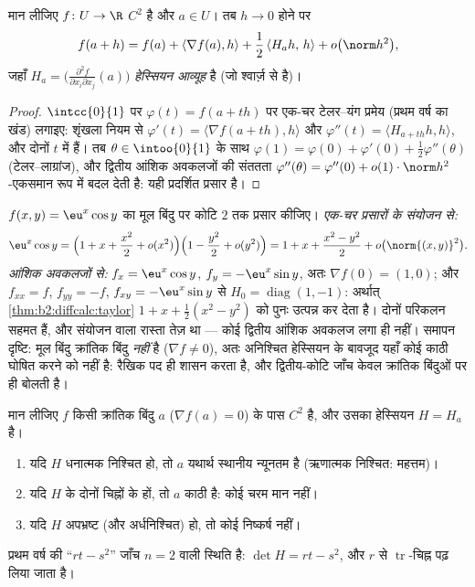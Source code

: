 \begin{theorem}[कोटि 2 पर टेलर--यंग]\label{thm:b2:diffcalc:taylor}
मान लीजिए $f \colon U \to \R$ $C^2$ है और $a \in U$। तब $h \to 0$ होने पर
\[
f(a + h) = f(a) + \langle\nabla f(a), h\rangle
+ \frac12\, \langle H_a h,\, h\rangle + o\bigl(\norm h^2\bigr),
\]
जहाँ $H_a = \bigl(\frac{\partial^2 f}{\partial x_i\partial
x_j}(a)\bigr)$ \emph{हेस्सियन आव्यूह} है (जो श्वार्ज़ से
 है)।
\end{theorem}

\begin{proof}
$\intcc{0}{1}$ पर $\varphi(t) = f(a + th)$ पर एक-चर टेलर--यंग प्रमेय (प्रथम वर्ष का खंड) लगाइए: शृंखला
नियम से $\varphi'(t) = \langle \nabla f(a + th), h\rangle$ और $\varphi''(t)
= \langle H_{a+th}h, h\rangle$, और दोनों $t$ में  हैं। तब $\theta \in \intoo{0}{1}$ के साथ
$\varphi(1) = \varphi(0) + \varphi'(0) + \frac12\varphi''(\theta)$
(टेलर--लाग्रांज), और द्वितीय आंशिक अवकलजों की संततता $\varphi''(\theta) =
\varphi''(0) + o(1)\cdot\norm h^2$-एकसमान रूप में
बदल देती है: यही प्रदर्शित प्रसार है।
\end{proof}

\begin{example}[एक प्रसार, दो तरह से]\label{ex:b2:diffcalc:taylortwoways}
$f(x, y) = \eu^x\cos y$ का मूल बिंदु पर कोटि $2$ तक प्रसार कीजिए। \emph{एक-चर प्रसारों के
संयोजन से:}
\[
\eu^x\cos y = \Bigl(1 + x + \frac{x^2}{2} +
o(x^2)\Bigr)\Bigl(1 - \frac{y^2}{2} + o(y^2)\Bigr)
= 1 + x + \frac{x^2 - y^2}{2} + o\bigl(\norm{(x,y)}^2\bigr) .
\]
\emph{आंशिक अवकलजों से:} $f_x = \eu^x\cos y$, $f_y =
-\eu^x\sin y$, अतः $\nabla f(0) = (1, 0)$; और $f_{xx} = f$, $f_{yy} = -f$, $f_{xy} = -\eu^x\sin y$ से $H_0 =
\operatorname{diag}(1, -1)$:
अर्थात् \cref{thm:b2:diffcalc:taylor} $1 + x + \frac12(x^2 - y^2)$ को पुनः उत्पन्न कर देता है। दोनों परिकलन सहमत हैं, और
संयोजन वाला रास्ता तेज़ था --- कोई द्वितीय आंशिक अवकलज लगा ही नहीं। समापन
दृष्टि: मूल बिंदु क्रांतिक बिंदु \emph{नहीं} है ($\nabla f \neq 0$), अतः अनिश्चित
हेस्सियन के बावजूद यहाँ कोई काठी घोषित करने को नहीं है: रैखिक पद ही शासन
करता है, और द्वितीय-कोटि जाँच केवल क्रांतिक बिंदुओं पर ही बोलती है।
\end{example}

\begin{theorem}[द्वितीय-कोटि चरम-मान जाँच, सिद्ध]\label{thm:b2:diffcalc:extrema}
मान लीजिए $f$ किसी क्रांतिक बिंदु $a$ ($\nabla f(a) = 0$) के पास $C^2$ है, और उसका
हेस्सियन $H = H_a$ है।
\begin{enumerate}
  \item यदि $H$ धनात्मक निश्चित हो, तो $a$ यथार्थ स्थानीय न्यूनतम है
        (ऋणात्मक निश्चित: महत्तम)।
  \item यदि $H$ के  दोनों चिह्नों के हों, तो $a$ काठी है:
        कोई चरम मान नहीं।
  \item यदि $H$ अपभ्रष्ट (और अर्धनिश्चित) हो, तो कोई निष्कर्ष नहीं।
\end{enumerate}
प्रथम वर्ष की ``$rt - s^2$'' जाँच $n = 2$ वाली स्थिति है: $\det H = rt -
s^2$, और $r$ से $\operatorname{tr}$-चिह्न
पढ़ लिया जाता है।
\end{theorem}

